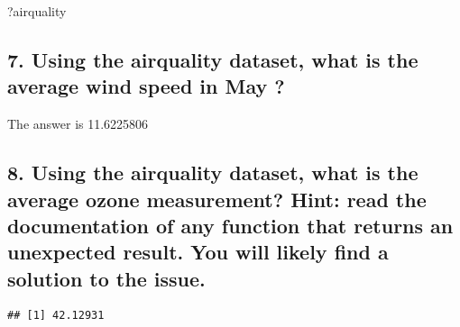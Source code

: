 \documentclass[
]{article}
\newenvironment{Shaded}{\begin{snugshade}}{\end{snugshade}}
\newcommand{\AttributeTok}[1]{\textcolor[rgb]{0.77,0.63,0.00}{#1}}
\newcommand{\ConstantTok}[1]{\textcolor[rgb]{0.00,0.00,0.00}{#1}}
\newcommand{\DecValTok}[1]{\textcolor[rgb]{0.00,0.00,0.81}{#1}}
\newcommand{\FunctionTok}[1]{\textcolor[rgb]{0.00,0.00,0.00}{#1}}
\newcommand{\NormalTok}[1]{#1}
\newcommand{\OtherTok}[1]{\textcolor[rgb]{0.56,0.35,0.01}{#1}}
\newcommand{\SpecialCharTok}[1]{\textcolor[rgb]{0.00,0.00,0.00}{#1}}
\begin{document}
\begin{Shaded}
\begin{Highlighting}[]
\NormalTok{?airquality}
\end{Highlighting}
\end{Shaded}

\hypertarget{using-the-airquality-dataset-what-is-the-average-wind-speed-in-may}{%
\subsection{7. Using the airquality dataset, what is the average wind
speed in May
?}\label{using-the-airquality-dataset-what-is-the-average-wind-speed-in-may}}

\begin{Shaded}
\end{Shaded}

The answer is 11.6225806

\hypertarget{using-the-airquality-dataset-what-is-the-average-ozone-measurement-hint-read-the-documentation-of-any-function-that-returns-an-unexpected-result.-you-will-likely-find-a-solution-to-the-issue.}{%
\subsection{8. Using the airquality dataset, what is the average ozone
measurement? Hint: read the documentation of any function that returns
an unexpected result. You will likely find a solution to the
issue.}\label{using-the-airquality-dataset-what-is-the-average-ozone-measurement-hint-read-the-documentation-of-any-function-that-returns-an-unexpected-result.-you-will-likely-find-a-solution-to-the-issue.}}

\begin{Shaded}
\end{Shaded}

\begin{verbatim}
## [1] 42.12931
\end{verbatim}
\end{document}
